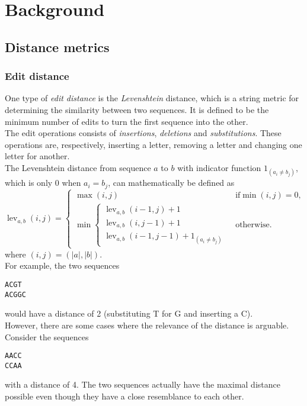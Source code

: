 \section{Background}

\subsection{Distance metrics}

\subsubsection{Edit distance}
One type of \emph{edit distance} is the \emph{Levenshtein} distance, which is a
string metric for determining the similarity between two sequences. It is
defined to be the minimum number of edits to turn the first sequence into the
other. \\
The edit operations consists of \emph{insertions}, \emph{deletions} and
\emph{substitutions}. These operations are, respectively, inserting a letter,
removing a letter and changing one letter for another. \\
The Levenshtein distance from sequence $a$ to $b$ with indicator function 
$1_(a_i\neq b_j)$, which is only $0$ when $a_i=b_j$, can mathematically be 
defined as
\begin{equation}
	\operatorname{lev}_{a,b}(i,j)= 
	\begin{cases}
	  	\max(i,j) & \text{ if} \min(i,j)=0, \\
  	  	\min \begin{cases}
        		\operatorname{lev}_{a,b}(i-1,j) + 1 \\
          	\operatorname{lev}_{a,b}(i,j-1) + 1 \\
          	\operatorname{lev}_{a,b}(i-1,j-1) + 1_{(a_i \neq b_j)}
       \end{cases} & \text{ otherwise.}
	\end{cases}
\end{equation}
where $(i,j)=(|a|,|b|)$.\\
For example, the two sequences
\begin{center}
\texttt{ACGT} \\
\texttt{ACGGC}
\end{center}
would have a distance of 2 (substituting T for G and inserting a C). \\
However, there are some cases where the relevance of the distance is arguable.
Consider the sequences
\begin{center}
\texttt{AACC} \\
\texttt{CCAA}
\end{center}
with a distance of 4. The two sequences actually have the maximal distance
possible even though they have a close resemblance to each other.


